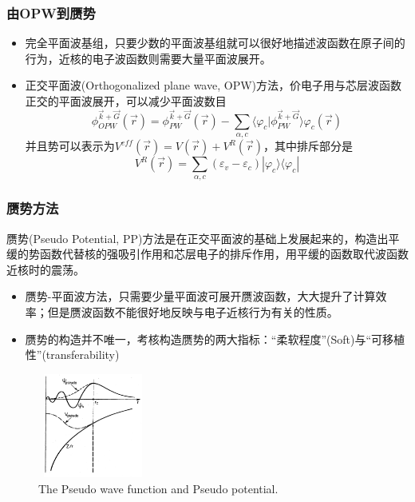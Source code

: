 \documentclass[cjk,slidestop,compress,mathserif,blue]{beamer}
\begin{document}

\frame
{
\frametitle{由OPW到赝势}
\begin{itemize}
\setlength{\itemsep}{5pt}
	\item 完全平面波基组，只要少数的平面波基组就可以很好地描述波函数在原子间的行为，近核的电子波函数则需要大量平面波展开。%
	\item 正交平面波(\textrm{Orthogonalized plane wave, OPW})方法，价电子用与芯层波函数正交的平面波展开，可以减少平面波数目
		\begin{displaymath}
			\phi_{OPW}^{\vec k+\vec G}(\vec r)=\phi_{PW}^{\vec k+\vec G}(\vec r)-\sum_{\alpha,c}\langle\varphi_c|\phi_{PW}^{\vec k+\vec G}\rangle\varphi_c(\vec r)
		\end{displaymath}
		并且势可以表示为$V^{eff}(\vec r)=V(\vec r)+V^R(\vec r)$，其中排斥部分是$$V^R(\vec r)=\sum_{\alpha,c}(\varepsilon_v-\varepsilon_c)|\varphi_c\rangle\langle\varphi_c|$$
\end{itemize}
}

\frame
{
\frametitle{赝势方法}
赝势(\textrm{Pseudo Potential, PP})方法是在正交平面波的基础上发展起来的，构造出平缓的势函数代替核的强吸引作用和芯层电子的排斥作用，用平缓的函数取代波函数近核时的震荡。
\begin{itemize}
\setlength{\itemsep}{5pt}
	\item 赝势-平面波方法，只需要少量平面波可展开赝波函数，大大提升了计算效率；但是赝波函数不能很好地反映与电子近核行为有关的性质。
	\item 赝势的构造并不唯一，考核构造赝势的两大指标：“柔软程度”\textrm{(Soft)}与“可移植性”\textrm{(transferability)}
\end{itemize}
\begin{figure}[h!]
\centering
\vspace*{-0.10in}
\includegraphics[height=1.35in,width=1.42in,viewport=154 100 562 508,clip]{Pseudo.eps}
\caption{\small \textrm{The Pseudo wave function and Pseudo potential.}}%
\label{Pseudo_Potential-Wave}
\end{figure}
}
\end{document}
